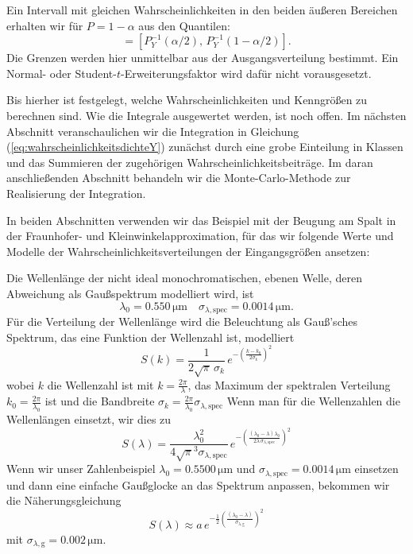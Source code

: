 Ein Intervall mit gleichen Wahrscheinlichkeiten in den beiden
äußeren Bereichen erhalten wir für $P=1-\alpha$ aus den Quantilen:
\begin{equation}
[y_{\mathrm{low}},y_{\mathrm{high}}]
=\left[P_Y^{-1}(\alpha/2),\,
P_Y^{-1}(1-\alpha/2)\right].
\end{equation}
Die Grenzen werden hier unmittelbar aus der Ausgangsverteilung
bestimmt. Ein Normal- oder Student-$t$-Erweiterungsfaktor wird
dafür nicht vorausgesetzt.

Bis hierher ist festgelegt, welche Wahrscheinlichkeiten und
Kenngrößen zu berechnen sind. Wie die Integrale ausgewertet werden,
ist noch offen. Im nächsten Abschnitt veranschaulichen wir die
Integration in Gleichung (\ref{eq:wahrscheinlichkeitsdichteY}) 
zunächst durch eine grobe Einteilung in Klassen und
das Summieren der zugehörigen Wahrscheinlichkeitsbeiträge.
Im daran anschließenden Abschnitt behandeln wir die Monte-Carlo-Methode zur Realisierung der Integration. 

In beiden Abschnitten verwenden wir das Beispiel mit der Beugung am Spalt in der Fraunhofer- und Kleinwinkelapproximation, für das wir folgende Werte und Modelle der Wahrscheinlichkeitsverteilungen der Eingangsgrößen ansetzen:


Die Wellenlänge der nicht ideal monochromatischen, ebenen Welle, deren Abweichung als Gaußspektrum modelliert wird, ist
$$
 \lambda_0 = 0.550 \, \mathrm{\mu m} \quad \sigma_{\lambda,\mathrm{spec}} = 0.0014 \, \mathrm{\mu m}.
$$
Für die Verteilung der Wellenlänge wird die Beleuchtung als Gauß'sches Spektrum, das eine Funktion der Wellenzahl ist, modelliert
$$
S(k) = \frac{1}{2\sqrt{\pi} \, \sigma_k} \, e^{-\left(\frac{k - k_0}{2 \sigma_k}\right)^2}
$$
wobei $k$ die Wellenzahl ist mit $k = \frac{2\pi}{\lambda}$, das Maximum der spektralen Verteilung $k_0 = \frac{2\pi}{\lambda_0}$ ist und die Bandbreite
$\sigma_k = \frac{2\pi}{\lambda_0} \sigma_{\lambda,\mathrm{spec}}$
Wenn man für die Wellenzahlen die Wellenlängen einsetzt, wir dies zu
$$
S(\lambda) = \frac{\lambda_0^2}{4\sqrt{\pi}^3 \sigma_{\lambda,\mathrm{spec}}} \, e^{-\left(\frac{(\lambda_0 - \lambda)\lambda_0}{2 \lambda \, \sigma_{\lambda,\mathrm{spec}}}\right)^2}
$$
Wenn wir unser Zahlenbeispiel
$\lambda_0 = 0.5500 \, \mathrm{\mu m}$ und $\sigma_{\lambda,\mathrm{spec}} = 0.0014 \, \mathrm{\mu m}$
einsetzen und dann eine einfache Gaußglocke an das Spektrum anpassen, bekommen wir die 
Näherungsgleichung 
\begin{equation}
S(\lambda) \approx a \, e^{- \frac{1}{2} \left(\frac{(\lambda_0 - \lambda)}{\sigma_{\lambda,\mathrm{g}}}\right)^2}
\label{eq:gaussspektrumWL}
\end{equation}
mit $\sigma_{\lambda,\mathrm{g}} = 0.002 \, \mathrm{\mu m}$.

